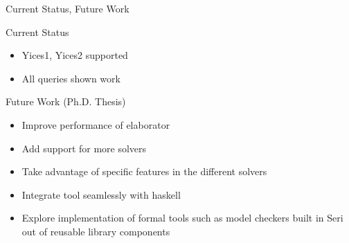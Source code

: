 \documentclass{beamer}
\begin{document}
\begin{frame}{Current Status, Future Work}
\begin{block}{Current Status}
    \begin{itemize}
        \item Yices1, Yices2 supported
        \item All queries shown work
    \end{itemize}
\end{block}
\begin{block}{Future Work (Ph.D. Thesis)}
    \begin{itemize}
        \item Improve performance of elaborator
        \item Add support for more solvers
        \item Take advantage of specific features in the different solvers
        \item Integrate tool seamlessly with haskell
        \item Explore implementation of formal tools such as model checkers
              built in Seri out of reusable library components
    \end{itemize}
\end{block}
\end{frame}
\end{document}
